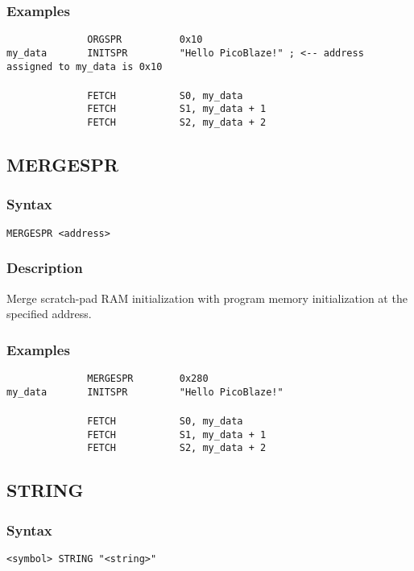         \subsubsection{Examples}
            \verb'              ORGSPR          0x10'\\
            \verb'my_data       INITSPR         "Hello PicoBlaze!" ; <-- address assigned to my_data is 0x10'\\
            \verb''\\
            \verb'              FETCH           S0, my_data'\\
            \verb'              FETCH           S1, my_data + 1'\\
            \verb'              FETCH           S2, my_data + 2'

    \subsection{MERGESPR}
        \subsubsection{Syntax}
            \verb'MERGESPR <address>'

        \subsubsection{Description}
            Merge scratch-pad RAM initialization with program memory initialization at the specified address.

        \subsubsection{Examples}
            \verb'              MERGESPR        0x280'\\
            \verb'my_data       INITSPR         "Hello PicoBlaze!"'\\
            \verb''\\
            \verb'              FETCH           S0, my_data'\\
            \verb'              FETCH           S1, my_data + 1'\\
            \verb'              FETCH           S2, my_data + 2'

    \subsection{STRING}
        \subsubsection{Syntax}
            \verb'<symbol> STRING "<string>"'


